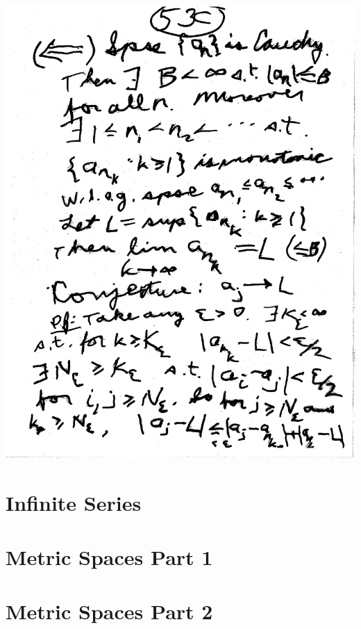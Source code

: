 \documentclass[10pt,a4paper]{article}
\begin{document}
\includegraphics[scale=.5]{Pages/LC_13}



\section{Infinite Series}






\section{Metric Spaces Part 1}





\section{Metric Spaces Part 2}




\end{document}
